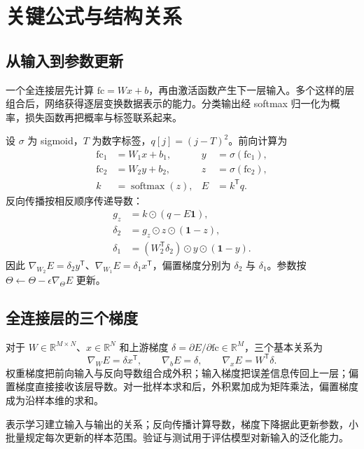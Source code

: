 \section{关键公式与结构关系}
\subsection{从输入到参数更新}
一个全连接层先计算 $\mathrm{fc}=Wx+b$，再由激活函数产生下一层输入。多个这样的层组合后，网络获得逐层变换数据表示的能力。分类输出经 softmax 归一化为概率，损失函数再把概率与标签联系起来。

\begin{keybox}[title={本讲两层网络的计算链}]
设 $\sigma$ 为 sigmoid，$T$ 为数字标签，$q[j]=(j-T)^2$。前向计算为
\begin{align*}
\mathrm{fc}_1&=W_1x+b_1,&y&=\sigma(\mathrm{fc}_1),\\
\mathrm{fc}_2&=W_2y+b_2,&z&=\sigma(\mathrm{fc}_2),\\
k&=\operatorname{softmax}(z),&E&=k^{\mathsf T}q.
\end{align*}
反向传播按相反顺序传递导数：
\begin{align*}
g_z&=k\mathbin{\odot}(q-E\mathbf{1}),\\
\delta_2&=g_z\mathbin{\odot} z\mathbin{\odot}(\mathbf{1}-z),\\
\delta_1&=(W_2^{\mathsf T}\delta_2)
\mathbin{\odot} y\mathbin{\odot}(\mathbf{1}-y).
\end{align*}
因此 $\nabla_{W_2}E=\delta_2y^{\mathsf T}$、$\nabla_{W_1}E=\delta_1x^{\mathsf T}$，偏置梯度分别为 $\delta_2$ 与 $\delta_1$。参数按 $\Theta\leftarrow\Theta-\epsilon\nabla_\Theta E$ 更新。
\end{keybox}

\subsection{全连接层的三个梯度}
对于 $W\in\mathbb{R}^{M\times N}$、$x\in\mathbb{R}^N$ 和上游梯度 $\delta=\partial E/\partial\mathrm{fc}\in\mathbb{R}^M$，三个基本关系为
\begin{equation*}
\boxed{\nabla_W E=\delta x^{\mathsf T}},\qquad
\boxed{\nabla_b E=\delta},\qquad
\boxed{\nabla_x E=W^{\mathsf T}\delta}.
\end{equation*}
权重梯度把前向输入与反向导数组合成外积；输入梯度把误差信息传回上一层；偏置梯度直接接收该层导数。对一批样本求和后，外积累加成为矩阵乘法，偏置梯度成为沿样本维的求和。

表示学习建立输入与输出的关系；反向传播计算导数，梯度下降据此更新参数，小批量规定每次更新的样本范围。验证与测试用于评估模型对新输入的泛化能力。
